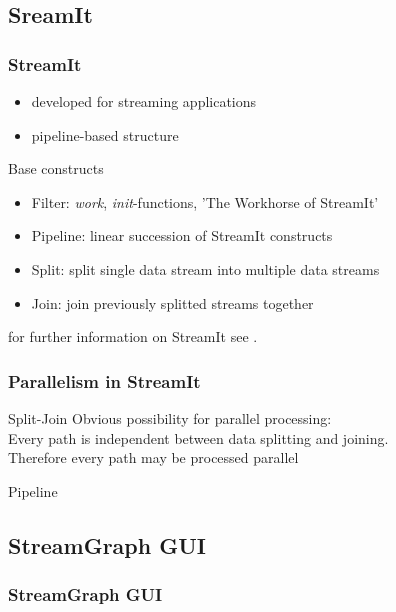 \documentclass{beamer}
\begin{document}
\subsection{SreamIt}
\begin{frame}
\frametitle{StreamIt}
	\begin{itemize}
		\item developed for streaming applications
		\item pipeline-based structure
	\end{itemize}
	\begin{block}{Base constructs}
		\begin{itemize}
			\item Filter: \textit{work}, \textit{init}-functions, 'The Workhorse of StreamIt'
			\item Pipeline: linear succession of StreamIt constructs
			\item Split: split single data stream into multiple data streams
			\item Join: join previously splitted streams together
		\end{itemize}
	\end{block}
	for further information on StreamIt see \cite{streamIt}.
\end{frame}

\begin{frame}
\frametitle{Parallelism in StreamIt}	
	\begin{block}{Split-Join}	
		Obvious possibility for parallel processing:\\
		Every path is independent between data splitting and joining.\\
		Therefore every path may be processed parallel
	\end{block}
	\begin{block}{Pipeline}
		
	\end{block}
\end{frame}

\subsection{StreamGraph GUI}
\begin{frame}
\frametitle{StreamGraph GUI}
\end{frame}
\end{document}

